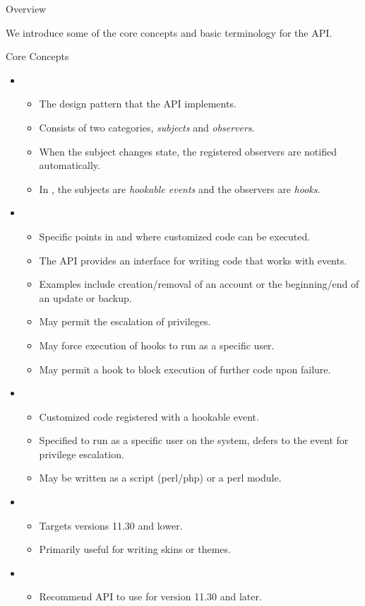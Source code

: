 \begin{section}{Overview}
  
We introduce some of the core concepts and basic terminology for the \cPanel API.
    
  \begin{subsection}{Core Concepts}
    \begin{itemize}
    \item {}
      \begin{itemize}
      \item The design pattern that the \cPanel API implements.
      \item Consists of two categories, {\em subjects} and {\em observers}.
      \item When the subject changes state, the registered observers are notified automatically.
      \item In \cPanel, the subjects are {\em hookable events} and the observers are {\em hooks}.
      \end{itemize}
    \item {}
      \begin{itemize}
      \item Specific points in \cPanel and \WHM where customized code can be executed.
      \item The \cPanel API provides an interface for writing code that works with \cPanel events.
      \item Examples include creation/removal of an account or the beginning/end of an update or backup.
      \item May permit the escalation of privileges.
      \item May force execution of hooks to run as a specific user.
      \item May permit a hook to block execution of further \cPanel code upon failure.
      \end{itemize}
    \item {}
      \begin{itemize}
      \item Customized code registered with a hookable event.
      \item Specified to run as a specific user on the system, defers to the event for privilege escalation.
      \item May be written as a script (perl/php) or a perl module.
      \end{itemize}
    \item {}
      \begin{itemize}
      \item Targets \cPanel versions 11.30 and lower.
      \item Primarily useful for writing skins or themes.
      \end{itemize}
    \item {}
      \begin{itemize}
      \item Recommend API to use for \cPanel version 11.30 and later.
      \end{itemize}
    \end{itemize}
  \end{subsection}  
\end{section}
